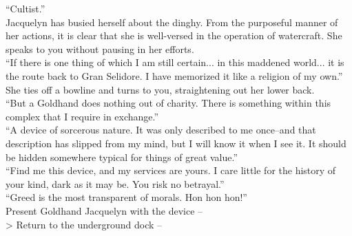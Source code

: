 “Cultist.”\\

Jacquelyn has busied herself about the dinghy. From the purposeful manner of her actions, it is clear that she is well-versed in the operation of watercraft. She speaks to you without pausing in her efforts.\\

“If there is one thing of which I am still certain... in this maddened world... it is the route back to Gran Selidore. I have memorized it like a religion of my own.”\\

She ties off a bowline and turns to you, straightening out her lower back.\\

“But a Goldhand does nothing out of charity. There is something within this complex that I require in exchange.”\\

“A device of sorcerous nature. It was only described to me once--and that description has slipped from my mind, but I will know it when I see it. It should be hidden somewhere typical for things of great value.”\\

“Find me this device, and my services are yours. I care little for the history of your kind, dark as it may be. You risk no betrayal.”\\

“Greed is the most transparent of morals. Hon hon hon!”\\

 Present Goldhand Jacquelyn with the device -- \\
> Return to the underground dock -- 